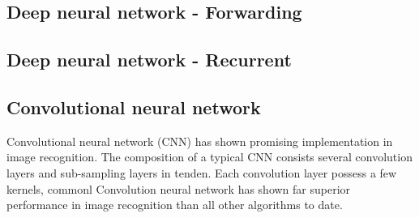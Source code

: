\subsection{Deep neural network - Forwarding}
\subsection{Deep neural network - Recurrent}
\subsection{Convolutional neural network}
Convolutional neural network (CNN) has shown promising implementation in image recognition. The composition of a typical CNN consists several convolution layers and sub-sampling layers in tenden. Each convolution layer possess a few kernels, commonl
Convolution neural network has shown far superior performance in image recognition than all other algorithms to date.~\cite{Szegedy_2015}